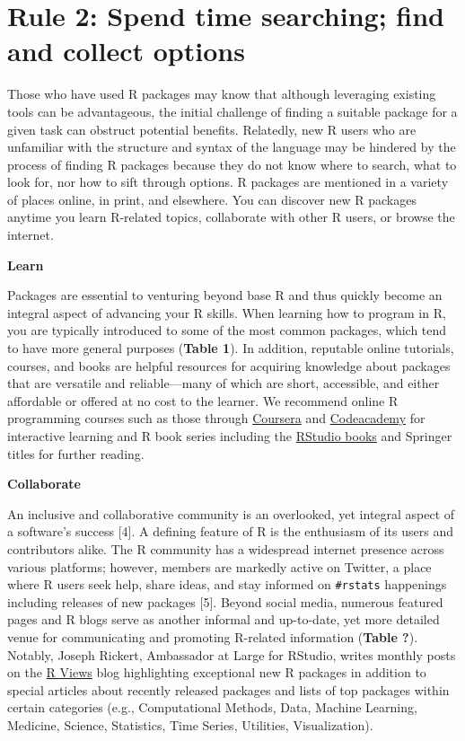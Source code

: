 \documentclass[10pt,letterpaper]{article}
\begin{document}
\hypertarget{rule-2-spend-time-searching-find-and-collect-options}{%
\section{Rule 2: Spend time searching; find and collect
options}\label{rule-2-spend-time-searching-find-and-collect-options}}

Those who have used R packages may know that although leveraging
existing tools can be advantageous, the initial challenge of finding a
suitable package for a given task can obstruct potential benefits.
Relatedly, new R users who are unfamiliar with the structure and syntax
of the language may be hindered by the process of finding R packages
because they do not know where to search, what to look for, nor how to
sift through options. R packages are mentioned in a variety of places
online, in print, and elsewhere. You can discover new R packages anytime
you learn R-related topics, collaborate with other R users, or browse
the internet.

\textbf{Learn}

Packages are essential to venturing beyond base R and thus quickly
become an integral aspect of advancing your R skills. When learning how
to program in R, you are typically introduced to some of the most common
packages, which tend to have more general purposes (\textbf{Table 1}).
In addition, reputable online tutorials, courses, and books are helpful
resources for acquiring knowledge about packages that are versatile and
reliable---many of which are short, accessible, and either affordable or
offered at no cost to the learner. We recommend online R programming
courses such as those through
\href{https://www.coursera.org/learn/r-programming}{Coursera} and
\href{https://www.codecademy.com/learn/learn-r}{Codeacademy} for
interactive learning and R book series including the
\href{https://rstudio.com/resources/books/}{RStudio books} and Springer
titles for further reading.

\textbf{Collaborate}

An inclusive and collaborative community is an overlooked, yet integral
aspect of a software's success {[}4{]}. A defining feature of R is the
enthusiasm of its users and contributors alike. The R community has a
widespread internet presence across various platforms; however, members
are markedly active on Twitter, a place where R users seek help, share
ideas, and stay informed on \texttt{\#rstats} happenings including
releases of new packages {[}5{]}. Beyond social media, numerous featured
pages and R blogs serve as another informal and up-to-date, yet more
detailed venue for communicating and promoting R-related information
(\textbf{Table ?}). Notably, Joseph Rickert, Ambassador at Large for
RStudio, writes monthly posts on the
\href{https://rviews.rstudio.com/}{R Views} blog highlighting
exceptional new R packages in addition to special articles about
recently released packages and lists of top packages within certain
categories (e.g., Computational Methods, Data, Machine Learning,
Medicine, Science, Statistics, Time Series, Utilities, Visualization).
\end{document}
